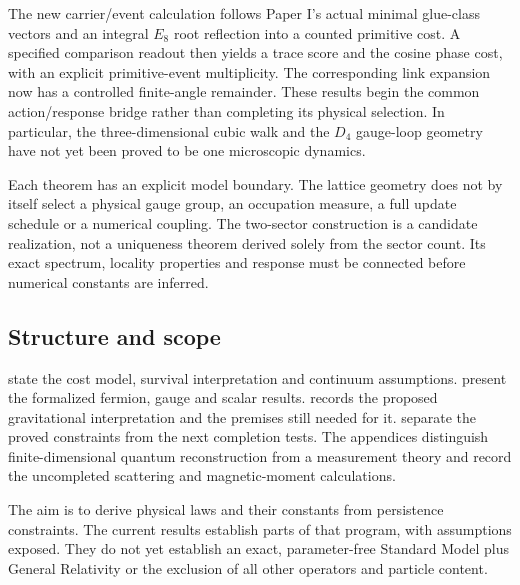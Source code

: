 The new carrier/event calculation follows Paper I's actual minimal glue-class vectors and an
integral $E_8$ root reflection into a counted primitive cost. A specified comparison readout
then yields a trace score and the cosine phase cost, with an explicit primitive-event
multiplicity. The corresponding link expansion now has a controlled finite-angle remainder.
These results begin the common action/response bridge rather than completing its physical
selection. In particular, the three-dimensional cubic walk and the $D_4$ gauge-loop geometry
have not yet been proved to be one microscopic dynamics.

Each theorem has an explicit model boundary. The lattice geometry does not by itself select a physical gauge group, an occupation measure, a full update schedule or a numerical coupling. The two-sector construction is a candidate realization, not a uniqueness theorem derived solely from the sector count. Its exact spectrum, locality properties and response must be connected before numerical constants are inferred.

\subsection{Structure and scope}
 state the cost model, survival interpretation and continuum assumptions.  present the formalized fermion, gauge and scalar results.  records the proposed gravitational interpretation and the premises still needed for it.  separate the proved constraints from the next completion tests. The appendices distinguish finite-dimensional quantum reconstruction from a measurement theory and record the uncompleted scattering and magnetic-moment calculations.

The aim is to derive physical laws and their constants from persistence constraints. The current results establish parts of that program, with assumptions exposed. They do not yet establish an exact, parameter-free Standard Model plus General Relativity or the exclusion of all other operators and particle content.
